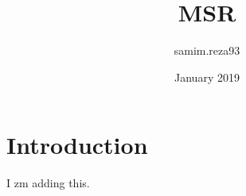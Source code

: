 \documentclass{article}
\title{MSR}
\author{samim.reza93 }
\date{January 2019}
\begin{document}
\maketitle

\section{Introduction}
I zm adding this.
\end{document}
